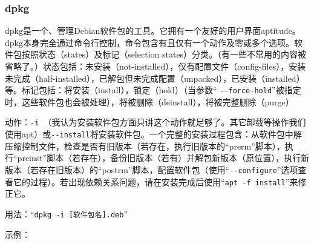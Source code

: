 \subsubsection{dpkg}
\cite{mandpkg}\par
dpkg是一个、管理Debian软件包的工具。它拥有一个友好的用户界面aptitude。dpkg本身完全通过命令行控制，命令包含有且仅有一个动作及零或多个选项。软件包按照状态（states）及标记（selection states）分类。（有一些不常用的内容被省略了。）状态包括：未安装（not-installed），仅有配置文件（config-files），安装未完成（half-installed），已解包但未完成配置（unpacked），已安装（installed）等。标记包括：将安装（install），锁定（hold）（当参数“ \verb|--force-hold|”被指定时，这些软件包也会被处理），将被删除（deinstall），将被完整删除（purge）\par
动作：\verb|-i |（我认为安装软件包方面只讲这个动作就足够了。其它卸载等操作我们使用apt）或\verb|--install|将安装软件包。一个完整的安装过程包含：从软件包中解压缩控制文件，检查是否有旧版本（若存在，执行旧版本的“prerm”脚本），执行“preinst”脚本（若存在），备份旧版本（若有）并解包新版本（原位置），执行新版本（若存在旧版本）的“postrm”脚本，配置软件包（使用“\verb|--configure|”选项查看它的过程）。若出现依赖关系问题，请在安装完成后使用“\verb|apt -f install|”来修正它。\par
用法：“\verb|dpkg -i [软件包名].deb|”\par
示例：
